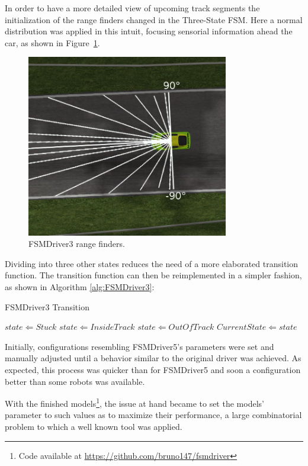 In order to have a more detailed view of upcoming track segments the initialization of the range finders changed in the Three-State FSM. Here a normal distribution was applied in this intuit, focusing sensorial information ahead the car, as shown in Figure~\ref{Fig:FSM3Sensors}.
\begin{figure}[h]
	\centering
	\includegraphics[width=250pt]{FSM3Sensors}
	\caption{FSMDriver3 range finders.}
	\label{Fig:FSM3Sensors}
\end{figure}

Dividing  into three other states reduces the need of a more elaborated transition function. The transition function can then be reimplemented in a simpler fashion, as shown in Algorithm \ref{alg:FSMDriver3}:

\begin{algorithm}[h]%
\caption{FSMDriver3 Transition}%
\label{alg:FSMDriver3}%
\begin{algorithmic}
        \STATE $state \Leftarrow Stuck$
    \ELSE
            \STATE $state \Leftarrow Inside Track$
        \ELSE
            \STATE $state \Leftarrow Out Of Track$
        \ENDIF
    \ENDIF
        \STATE $Current State \Leftarrow state$
    \ENDIF
\end{algorithmic}
\end{algorithm}

Initially, configurations resembling FSMDriver5's parameters were set and manually adjusted until a behavior similar to the original driver was achieved. As expected, this process was quicker than for FSMDriver5 and soon a configuration better than some robots was available.

With the finished models\footnote{Code available at \url{https://github.com/bruno147/fsmdriver}}, the issue at hand became to set the models' parameter to such values as to maximize their performance, a large combinatorial problem to which a well known tool was applied.

